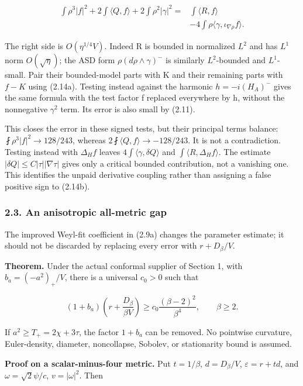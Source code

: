 \documentclass[
  10pt,
]{article}
\begin{document}
\[
\begin{aligned}
 \int\rho^3|f|^2+2\int\langle Q,f\rangle+2\int\rho^2|\gamma|^2
 ={}&\int\langle R,f\rangle\\
 &-4\int\rho\langle\gamma,\iota_{\nabla\rho}f\rangle.
\end{aligned}
 \tag{2.14b}
\]

The right side is \(O(\eta^{1/4}V)\). Indeed R is bounded in normalized
\(L^2\) and has \(L^1\) norm \(O(\sqrt\eta)\); the ASD form
\(\rho(d\rho\wedge\gamma)^-\) is similarly \(L^2\)-bounded and
\(L^1\)-small. Pair their bounded-model parts with K and their remaining
parts with \(f-K\) using (2.14a). Testing instead against the harmonic
\(h=-i(H_A)^-\) gives the same formula with the test factor f replaced
everywhere by h, without the nonnegative \(\gamma^2\) term. Its error is
also small by (2.11).

This closes the error in these signed tests, but their principal terms
balance: \(\fint\rho^3|f|^2\to128/243\), whereas
\(2\fint\langle Q,f\rangle\to-128/243\). It is not a contradiction.
Testing instead with \(\Delta_H f\) leaves
\(4\int\langle\gamma,\delta Q\rangle\) and
\(\int\langle R,\Delta_H f\rangle\). The estimate
\(|\delta Q|\le C|\tau||\nabla\tau|\) gives only a critical bounded
contribution, not a vanishing one. This identifies the unpaid derivative
coupling rather than assigning a false positive sign to (2.14b).

\hypertarget{an-anisotropic-all-metric-gap}{%
\subsubsection{2.3. An anisotropic all-metric
gap}\label{an-anisotropic-all-metric-gap}}

The improved Weyl-fit coefficient in (2.9a) changes the parameter
estimate; it should not be discarded by replacing every error with
\(r+D_\beta/V\).

\textbf{Theorem.} Under the actual conformal supplier of Section 1, with
\(b_a=(-a^2)_+/V\), there is a universal \(c_0>0\) such that

\[
 \boxed{(1+b_a)\left(r+\frac{D_\beta}{\beta V}\right)
       \ge c_0\frac{(\beta-2)^2}{\beta^4},\qquad \beta\ge2.}
 \tag{2.15}
\]

If \(a^2\ge T_+=2\chi+3\tau\), the factor \(1+b_a\) can be removed. No
pointwise curvature, Euler-density, diameter, noncollapse, Sobolev, or
stationarity bound is assumed.

\textbf{Proof on a scalar-minus-four metric.} Put \(t=1/\beta\),
\(d=D_\beta/V\), \(\varepsilon=r+td\), and \(\omega=\sqrt2\psi/c\),
\(v=|\omega|^2\). Then
\end{document}
